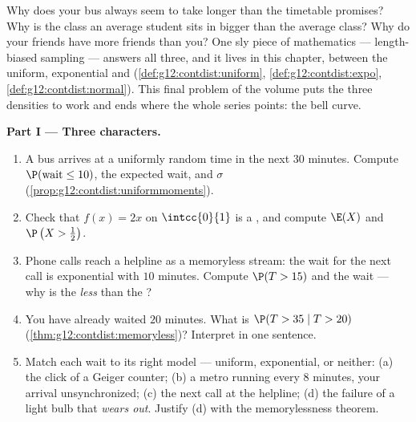 \begin{problem}
\label{pb:g12:contdist:1}
Why does your bus always seem to take longer than the timetable
promises? Why is the class an average student sits in bigger
than the average class? Why do your friends have more friends
than you? One sly piece of mathematics --- length-biased
sampling --- answers all three, and it lives in this chapter,
between the uniform, exponential and 
(\cref{def:g12:contdist:uniform}, \cref{def:g12:contdist:expo},
\cref{def:g12:contdist:normal}). This final problem of the
volume puts the three densities to work and ends where the whole
series points: the bell curve.

\medskip
\noindent\textbf{Part I --- Three characters.}
\begin{enumerate}
  \item A bus arrives at a uniformly random time in the next
        $30$ minutes. Compute $\P(\text{wait} \leq 10)$, the
        expected wait, and $\sigma$
        (\cref{prop:g12:contdist:uniformmoments}).
  \item Check that $f(x) = 2x$ on $\intcc{0}{1}$ is a ,
        and compute $\E(X)$ and $\P\left(X > \frac12\right)$.
  \item Phone calls reach a helpline as a memoryless stream:
        the wait for the next call is exponential with 
        $10$ minutes. Compute $\P(T > 15)$ and the  wait
        --- why is the  \emph{less} than the ?
  \item You have already waited $20$ minutes. What is
        $\P(T > 35 \mid T > 20)$
        (\cref{thm:g12:contdist:memoryless})? Interpret in one
        sentence.
  \item Match each wait to its right model --- uniform,
        exponential, or neither: (a) the click of a Geiger
        counter; (b) a metro running every $8$ minutes, your
        arrival unsynchronized; (c) the next call at the
        helpline; (d) the failure of a light bulb that
        \emph{wears out}. Justify (d) with the memorylessness
        theorem.
\end{enumerate}


\end{problem}
